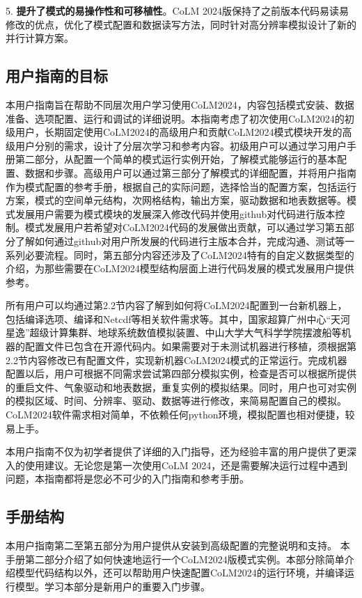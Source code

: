 5. \textbf{提升了模式的易操作性和可移植性}。CoLM 2024版保持了之前版本代码易读易修改的优点，优化了模式配置和数据读写方法，同时针对高分辨率模拟设计了新的并行计算方案。

\subsection{用户指南的目标}

本用户指南旨在帮助不同层次用户学习使用CoLM2024，内容包括模式安装、数据准备、选项配置、运行和调试的详细说明。本指南考虑了初次使用CoLM2024的初级用户，长期固定使用CoLM2024的高级用户和贡献CoLM2024模式模块开发的高级用户分别的需求，设计了分层次学习和参考内容。初级用户可以通过学习用户手册第二部分，从配置一个简单的模式运行实例开始，了解模式能够运行的基本配置、数据和步骤。高级用户可以通过第三部分了解模式的详细配置，并将用户指南作为模式配置的参考手册，根据自己的实际问题，选择恰当的配置方案，包括运行方案，模式的空间单元结构，次网格结构，输出方案，驱动数据和地表数据等。模式发展用户需要为模式模块的发展深入修改代码并使用github对代码进行版本控制。模式发展用户若希望对CoLM2024代码的发展做出贡献，可以通过学习第五部分了解如何通过github对用户所发展的代码进行主版本合并，完成沟通、测试等一系列必要流程。同时，第五部分内容还涉及了CoLM2024特有的自定义数据类型的介绍，为那些需要在CoLM2024模型结构层面上进行代码发展的模式发展用户提供参考。

所有用户可以均通过第2.2节内容了解到如何将CoLM2024配置到一台新机器上，包括编译选项、编译和Netcdf等相关软件需求等。其中，国家超算广州中心“天河星逸”超级计算集群、地球系统数值模拟装置、中山大学大气科学学院摆渡船等机器的配置文件已包含在开源代码内。如果需要对于未测试机器进行移植，须根据第2.2节内容修改已有配置文件，实现新机器CoLM2024模式的正常运行。完成机器配置以后，用户可根据不同需求尝试第四部分模拟实例，检查是否可以根据所提供的重启文件、气象驱动和地表数据，重复实例的模拟结果。同时，用户也可对实例的模拟区域、时间、分辨率、驱动、数据等进行修改，来简易配置自己的模拟。CoLM2024软件需求相对简单，不依赖任何python环境，模拟配置也相对便捷，较易上手。

本用户指南不仅为初学者提供了详细的入门指导，还为经验丰富的用户提供了更深入的使用建议。无论您是第一次使用CoLM 2024，还是需要解决运行过程中遇到问题，本指南都将是您必不可少的入门指南和参考手册。


\subsection{手册结构}

本用户指南第二至第五部分为用户提供从安装到高级配置的完整说明和支持。
本手册第二部分介绍了如何快速地运行一个CoLM2024版模式实例。本部分除简单介绍模型代码结构以外，还可以帮助用户快速配置CoLM2024的运行环境，并编译运行模型。学习本部分是新用户的重要入门步骤。


